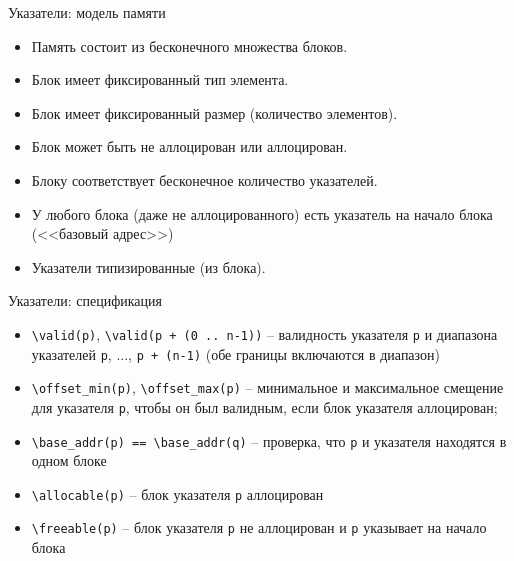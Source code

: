 \documentclass[hyperref={unicode=true}]{beamer}
\begin{document}
    \begin{frame}{Указатели: модель памяти}
    \begin{itemize}
    \item
    Память состоит из бесконечного множества блоков.
    \item    
    Блок имеет фиксированный тип элемента.
    \item
    Блок имеет фиксированный размер (количество элементов).
    \item
    Блок может быть не аллоцирован или аллоцирован.
    \item
    Блоку соответствует бесконечное количество указателей.
    \item
    У любого блока (даже не аллоцированного) есть указатель на начало блока
    (<<базовый адрес>>)
    \item
    Указатели типизированные (из блока).
    \end{itemize}
    \end{frame}

    \begin{frame}[fragile]{Указатели: спецификация}
    \begin{itemize}
    \item
    \verb|\valid(p)|, \verb|\valid(p + (0 .. n-1))| -- валидность
    указателя \verb|p| и диапазона указателей \verb|p|, ..., \verb|p + (n-1)|
    (обе границы включаются в диапазон)
    \item
    \verb|\offset_min(p)|, \verb|\offset_max(p)| -- минимальное
    и максимальное смещение для указателя \verb|p|, чтобы он был валидным,
    если блок указателя аллоцирован;
    \item
    \verb|\base_addr(p) == \base_addr(q)| -- проверка, что \verb|p|
    и указателя находятся в одном блоке
    \item
    \verb|\allocable(p)| -- блок указателя \verb|p| аллоцирован
    \item
    \verb|\freeable(p)| -- блок указателя \verb|p| не аллоцирован и \verb|p| указывает
    на начало блока
    \end{itemize}
    \end{frame}
\end{document}
